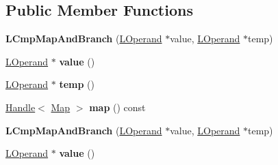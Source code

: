 \subsection*{Public Member Functions}
\begin{DoxyCompactItemize}
\item 
{\bfseries L\+Cmp\+Map\+And\+Branch} (\hyperlink{classv8_1_1internal_1_1_l_operand}{L\+Operand} $\ast$value, \hyperlink{classv8_1_1internal_1_1_l_operand}{L\+Operand} $\ast$temp)\hypertarget{classv8_1_1internal_1_1_l_cmp_map_and_branch_aee8dfd1117eec6e69050b9398850746f}{}\label{classv8_1_1internal_1_1_l_cmp_map_and_branch_aee8dfd1117eec6e69050b9398850746f}

\item 
\hyperlink{classv8_1_1internal_1_1_l_operand}{L\+Operand} $\ast$ {\bfseries value} ()\hypertarget{classv8_1_1internal_1_1_l_cmp_map_and_branch_af62c45388a4e7e5951497d680a0238a8}{}\label{classv8_1_1internal_1_1_l_cmp_map_and_branch_af62c45388a4e7e5951497d680a0238a8}

\item 
\hyperlink{classv8_1_1internal_1_1_l_operand}{L\+Operand} $\ast$ {\bfseries temp} ()\hypertarget{classv8_1_1internal_1_1_l_cmp_map_and_branch_a0e2a496d7039ad623ef8497d8a87c9d1}{}\label{classv8_1_1internal_1_1_l_cmp_map_and_branch_a0e2a496d7039ad623ef8497d8a87c9d1}

\item 
\hyperlink{classv8_1_1internal_1_1_handle}{Handle}$<$ \hyperlink{classv8_1_1internal_1_1_map}{Map} $>$ {\bfseries map} () const \hypertarget{classv8_1_1internal_1_1_l_cmp_map_and_branch_ad73743d4670ddad80c4d9a4cecb693d3}{}\label{classv8_1_1internal_1_1_l_cmp_map_and_branch_ad73743d4670ddad80c4d9a4cecb693d3}

\item 
{\bfseries L\+Cmp\+Map\+And\+Branch} (\hyperlink{classv8_1_1internal_1_1_l_operand}{L\+Operand} $\ast$value, \hyperlink{classv8_1_1internal_1_1_l_operand}{L\+Operand} $\ast$temp)\hypertarget{classv8_1_1internal_1_1_l_cmp_map_and_branch_aee8dfd1117eec6e69050b9398850746f}{}\label{classv8_1_1internal_1_1_l_cmp_map_and_branch_aee8dfd1117eec6e69050b9398850746f}

\item 
\hyperlink{classv8_1_1internal_1_1_l_operand}{L\+Operand} $\ast$ {\bfseries value} ()\hypertarget{classv8_1_1internal_1_1_l_cmp_map_and_branch_af62c45388a4e7e5951497d680a0238a8}{}\label{classv8_1_1internal_1_1_l_cmp_map_and_branch_af62c45388a4e7e5951497d680a0238a8}


\end{DoxyCompactItemize}

